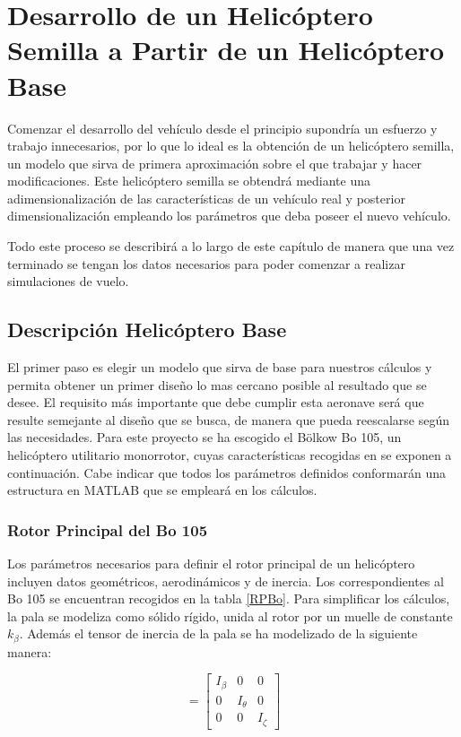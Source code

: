 \chapter{Desarrollo de un Helicóptero Semilla a Partir de un Helicóptero Base}


Comenzar el desarrollo del vehículo desde el principio supondría un esfuerzo y trabajo innecesarios, por lo que lo ideal es la obtención de un helicóptero semilla, un modelo que sirva de primera aproximación sobre el que trabajar y hacer modificaciones. Este helicóptero semilla se obtendrá mediante una adimensionalización de las características de un vehículo real y posterior dimensionalización empleando los parámetros que deba poseer el nuevo vehículo.

Todo este proceso se describirá a lo largo de este capítulo de manera que una vez terminado se tengan los datos necesarios para poder comenzar a realizar simulaciones de vuelo.

\section{Descripción Helicóptero Base}

El primer paso es elegir un modelo que sirva de base para nuestros cálculos y permita obtener un primer diseño lo mas cercano posible al resultado que se desee. El requisito más importante que debe cumplir esta aeronave será que resulte semejante al diseño que se busca, de manera que pueda reescalarse según las necesidades. Para este proyecto se ha escogido el Bölkow Bo 105, un helicóptero utilitario monorrotor, cuyas características recogidas en \citet{Padfield} se exponen a continuación. Cabe indicar que todos los parámetros definidos conformarán una estructura en MATLAB que se empleará en los cálculos.

\subsection{Rotor Principal del Bo 105}

Los parámetros necesarios para definir el rotor principal de un helicóptero incluyen datos geométricos, aerodinámicos y de inercia. Los correspondientes al Bo 105 se encuentran recogidos en la tabla \ref{RPBo}.
Para simplificar los cálculos, la pala se modeliza como sólido rígido, unida al rotor por un muelle de constante $k_\beta$.
Además el tensor de inercia de la pala se ha modelizado de la siguiente manera:

\begin{equation}
[I_B]=\left[	
\begin{array}{ccc}
I_\beta & 0 & 0\\
0 & I_\theta & 0\\
0 & 0 & I_\zeta
\end{array}
\right]
\end{equation}


